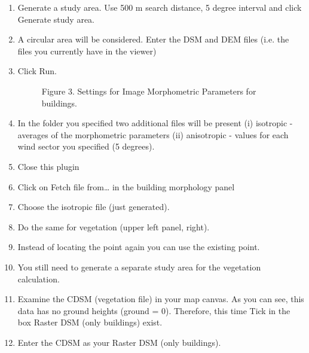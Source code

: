 \documentclass[letterpaper,10pt,english]{sphinxmanual}
\begin{document}
\begin{enumerate}
\item {} 
Generate a study area. Use 500 m search distance, 5 degree interval
and click Generate study area.

\item {} 
A circular area will be considered. Enter the DSM and DEM files (i.e.
the files you currently have in the viewer)

\item {} 
Click Run.

\begin{figure}[htbp]
\centering
\capstart

\noindent{}
\caption{Figure 3. Settings for Image Morphometric Parameters for buildings.}\label{\detokenize{Tutorials/SuewsAdvanced:id3}}\end{figure}

\item {} 
In the folder you specified two additional files will be present (i)
isotropic - averages of the morphometric parameters (ii) anisotropic
- values for each wind sector you specified (5 degrees).

\item {} 
Close this plugin

\item {} 
Click on Fetch file from… in the building morphology panel

\item {} 
Choose the isotropic file (just generated).

\item {} 
Do the same for vegetation (upper left panel, right).

\item {} 
Instead of locating the point again you can use the existing point.

\item {} 
You still need to generate a separate study area for the vegetation
calculation.

\item {} 
Examine the CDSM (vegetation file) in your map canvas. As you can
see, this data has no ground heights (ground = 0). Therefore, this
time Tick in the box Raster DSM (only buildings) exist.

\item {} 
Enter the CDSM as your Raster DSM (only buildings).

\begin{figure}[htbp]
\centering
\capstart


\end{figure}
\end{enumerate}
\end{document}
